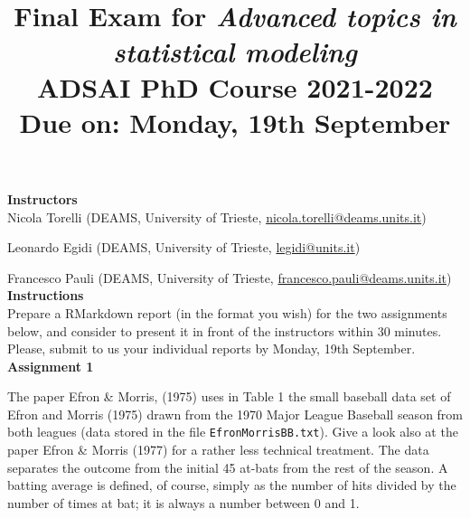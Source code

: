 \title{\large{
\textbf{Final Exam for \emph{Advanced topics in statistical modeling}}\\
ADSAI PhD Course 2021-2022 }\\
Due on: Monday, 19th September}
%
%
\date{}
\maketitle
%
\hspace{-0.8cm}
\textbf{Instructors} \\

Nicola Torelli (DEAMS, University of Trieste, \url{nicola.torelli@deams.units.it})

Leonardo Egidi (DEAMS, University of Trieste, \url{legidi@units.it})

Francesco Pauli (DEAMS, University of Trieste, \url{francesco.pauli@deams.units.it})\\


\hspace{-0.8cm}
\textbf{Instructions} \\

Prepare a RMarkdown report (in the format you wish) for the two assignments below, and consider to present it in front of the instructors within 30 minutes. Please, submit to us your individual reports by Monday, 19th September.\\

\hspace{-0.8cm}
\textbf{Assignment 1}
\vspace{0.5cm}

The paper Efron \& Morris, (1975) uses in Table 1 the small baseball data set of Efron and Morris (1975) drawn from the 1970 Major League Baseball season from both leagues (data stored in the file \texttt{EfronMorrisBB.txt}). Give a look also at the paper Efron \& Morris (1977) for a rather less technical treatment.  The data separates the outcome from the initial 45 at-bats from the rest of the season. A
batting average is defined, of course, simply as the number of hits divided by
the number of times at bat; it is always a number between 0 and 1.


